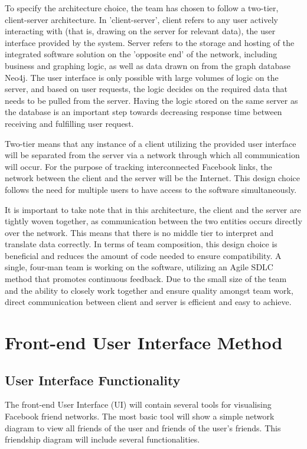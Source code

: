 \documentclass[10pt,onecolumn]{article}
\begin{document}
To specify the architecture choice, the team has chosen to follow a two-tier, client-server architecture. In 'client-server', client refers to any user actively interacting with (that is, drawing on the server for relevant data), the user interface provided by the system. Server refers to the storage and hosting of the integrated software solution on the 'opposite end' of the network, including business and graphing logic, as well as data drawn on from the graph database Neo4j. The user interface is only possible with large volumes of logic on the server, and based on user requests, the logic decides on the required data that needs to be pulled from the server. Having the logic stored on the same server as the database is an important step towards decreasing response time between receiving and fulfilling user request. \cite {twotieradvantage}

Two-tier means that any instance of a client utilizing the provided user interface will be separated from the server via a network through which all communication will occur. For the purpose of tracking interconnected Facebook links, the network between the client and the server will be the Internet. This design choice follows the need for multiple users to have access to the software simultaneously. \cite {beginningsofteng}

It is important to take note that in this architecture, the client and the server are tightly woven together, as communication between the two entities occurs directly over the network. This means that there is no middle tier to interpret and translate data correctly. In terms of team composition, this design choice is beneficial and reduces the amount of code needed to ensure compatibility. A single, four-man team is working on the software, utilizing an Agile SDLC method that promotes continuous feedback. Due to the small size of the team and the ability to closely work together and ensure quality amongst team work, direct communication between client and server is efficient and easy to achieve.



\section{Front-end User Interface Method}

\subsection{User Interface Functionality}
The front-end User Interface (UI) will contain several tools for visualising Facebook friend networks. The most basic tool will show a simple network diagram to view all friends of the user and friends of the user's friends. This friendship diagram will include several functionalities.
\end{document}
